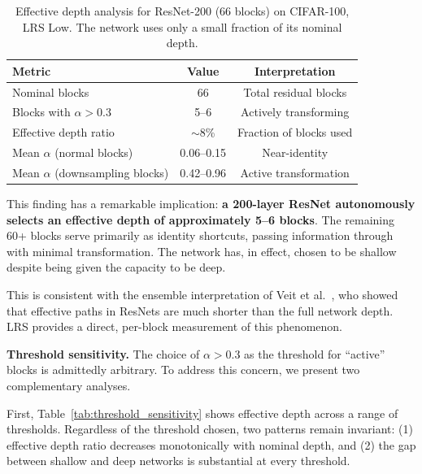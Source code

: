 \documentclass[preprint,12pt]{elsarticle}
\begin{document}
\begin{table}[t]
\centering
\caption{Effective depth analysis for ResNet-200 (66 blocks) on CIFAR-100, LRS Low. The network uses only a small fraction of its nominal depth.}
\label{tab:effective_depth}
\begin{tabular}{lcc}
\toprule
\textbf{Metric} & \textbf{Value} & \textbf{Interpretation} \\
\midrule
Nominal blocks & 66 & Total residual blocks \\
Blocks with $\alpha > 0.3$ & 5--6 & Actively transforming \\
Effective depth ratio & $\sim$8\% & Fraction of blocks used \\
Mean $\alpha$ (normal blocks) & 0.06--0.15 & Near-identity \\
Mean $\alpha$ (downsampling blocks) & 0.42--0.96 & Active transformation \\
\bottomrule
\end{tabular}
\end{table}

This finding has a remarkable implication: \textbf{a 200-layer ResNet autonomously selects an effective depth of approximately 5--6 blocks}. The remaining 60+ blocks serve primarily as identity shortcuts, passing information through with minimal transformation. The network has, in effect, chosen to be shallow despite being given the capacity to be deep.

This is consistent with the ensemble interpretation of Veit et al.~\cite{veit2016residual}, who showed that effective paths in ResNets are much shorter than the full network depth. LRS provides a direct, per-block measurement of this phenomenon.

\textbf{Threshold sensitivity.} The choice of $\alpha > 0.3$ as the threshold for ``active'' blocks is admittedly arbitrary. To address this concern, we present two complementary analyses.

First, Table~\ref{tab:threshold_sensitivity} shows effective depth across a range of thresholds. Regardless of the threshold chosen, two patterns remain invariant: (1) effective depth ratio decreases monotonically with nominal depth, and (2) the gap between shallow and deep networks is substantial at every threshold.
\end{document}
